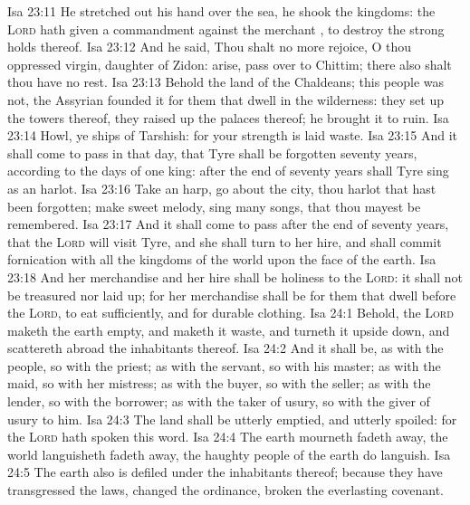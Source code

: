 \vs Isa 23:11 He stretched out his hand over the sea, he shook the kingdoms: the \textsc{Lord} hath given a commandment against the merchant , to destroy the strong holds thereof.
\vs Isa 23:12 And he said, Thou shalt no more rejoice, O thou oppressed virgin, daughter of Zidon: arise, pass over to Chittim; there also shalt thou have no rest.
\vs Isa 23:13 Behold the land of the Chaldeans; this people was not,  the Assyrian founded it for them that dwell in the wilderness: they set up the towers thereof, they raised up the palaces thereof;  he brought it to ruin.
\vs Isa 23:14 Howl, ye ships of Tarshish: for your strength is laid waste.
\vs Isa 23:15 And it shall come to pass in that day, that Tyre shall be forgotten seventy years, according to the days of one king: after the end of seventy years shall Tyre sing as an harlot.
\vs Isa 23:16 Take an harp, go about the city, thou harlot that hast been forgotten; make sweet melody, sing many songs, that thou mayest be remembered.
\vs Isa 23:17 And it shall come to pass after the end of seventy years, that the \textsc{Lord} will visit Tyre, and she shall turn to her hire, and shall commit fornication with all the kingdoms of the world upon the face of the earth.
\vs Isa 23:18 And her merchandise and her hire shall be holiness to the \textsc{Lord}: it shall not be treasured nor laid up; for her merchandise shall be for them that dwell before the \textsc{Lord}, to eat sufficiently, and for durable clothing.
\vs Isa 24:1 Behold, the \textsc{Lord} maketh the earth empty, and maketh it waste, and turneth it upside down, and scattereth abroad the inhabitants thereof.
\vs Isa 24:2 And it shall be, as with the people, so with the priest; as with the servant, so with his master; as with the maid, so with her mistress; as with the buyer, so with the seller; as with the lender, so with the borrower; as with the taker of usury, so with the giver of usury to him.
\vs Isa 24:3 The land shall be utterly emptied, and utterly spoiled: for the \textsc{Lord} hath spoken this word.
\vs Isa 24:4 The earth mourneth  fadeth away, the world languisheth  fadeth away, the haughty people of the earth do languish.
\vs Isa 24:5 The earth also is defiled under the inhabitants thereof; because they have transgressed the laws, changed the ordinance, broken the everlasting covenant.
